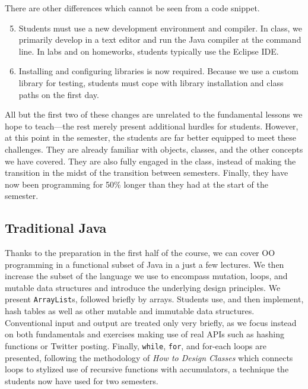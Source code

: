 \documentclass[submission,copyright]{eptcs}
\def\htdc{\emph{How to Design Classes}\xspace}
\begin{document}
\noindent
There are other differences which cannot be seen from a code snippet.

\begin{enumerate}
  \setcounter{enumi}{4}
\item Students must use a new development environment and compiler.
  In class, we primarily develop in a text editor and run the Java
  compiler at the command line.  In labs and on homeworks, students
  typically use the Eclipse IDE.
\item Installing and configuring libraries is now required.  Because
  we use a custom library for testing, students must cope with library
  installation and class paths on the first day.
\end{enumerate}

All but the first two of these changes are unrelated to the
fundamental lessons we hope to teach---the rest merely present
additional hurdles for students.  However, at this point in the
semester, the students are far better equipped to meet these
challenges.  They are already familiar with objects, classes, and the
other concepts we have covered.  They are also fully engaged in the
class, instead of making the transition in the midst of the transition
between semesters.  Finally, they have now been programming for 50\%
longer than they had at the start of the semester.

\subsection{Traditional Java}

Thanks to the preparation in the first half of the course, we can
cover OO programming in a functional subset of Java in a just a few
lectures.  We then increase the subset of the language we use to
encompass mutation, loops, and mutable data structures and introduce
the underlying design principles. We present \texttt{ArrayList}s,
followed briefly by arrays. Students use, and then implement, hash
tables as well as other mutable and immutable data structures.
Conventional input and output are treated only very briefly, as we
focus instead on both fundamentals and exercises making use of real
APIs such as hashing functions or Twitter posting.  Finally,
\texttt{while}, \texttt{for}, and for-each loops are presented,
following the methodology of \htdc which connects loops to stylized
use of recursive functions with accumulators, a technique the students
now have used for two semesters.
\end{document}
